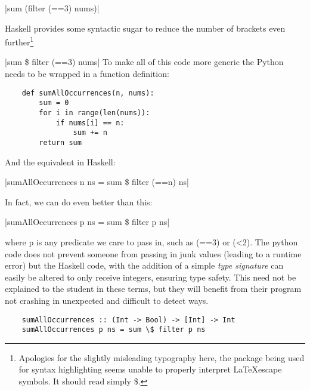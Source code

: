 \documentclass[11pt, a4paper]{article}
\begin{document}
|sum (filter (==3) nums)|

Haskell provides some syntactic sugar to reduce the number of brackets even further\footnote{Apologies for the slightly misleading typography
    here, the package being used for syntax highlighting seems unable to properly interpret \LaTeX escape symbols. It should read simply \$.}


|sum \$ filter (==3) nums|    
To make all of this code more generic the Python needs to be wrapped in a function definition:

\begin{verbatim}
    def sumAllOccurrences(n, nums):
        sum = 0
        for i in range(len(nums)):
            if nums[i] == n:
                sum += n
        return sum
\end{verbatim}

And the equivalent in Haskell:

|sumAllOccurrences n ns = sum \$ filter (==n) ns|

In fact, we can do even better than this:

|sumAllOccurrences p ns = sum \$ filter p ns|

where p is any predicate we care to pass in, such as (==3) or (\textless2). The python code does not prevent
someone from passing in junk values (leading to a runtime error) but the Haskell code, with the
addition of a simple \textit{type signature} can easily be altered to only receive integers,
ensuring type safety. This need not be explained to the student in these terms, but they will
benefit from their program not crashing in unexpected and difficult to detect ways.

\begin{verbatim}
    sumAllOccurrences :: (Int -> Bool) -> [Int] -> Int
    sumAllOccurrences p ns = sum \$ filter p ns
\end{verbatim}
\end{document}

